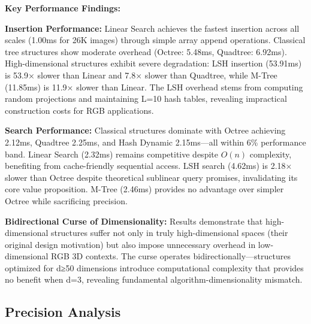 \documentclass{sbc2023}
\begin{document}
\textbf{Key Performance Findings:}

\textbf{Insertion Performance:} Linear Search achieves the fastest insertion across all scales (1.00ms for 26K images) through simple array append operations. Classical tree structures show moderate overhead (Octree: 5.48ms, Quadtree: 6.92ms). High-dimensional structures exhibit severe degradation: LSH insertion (53.91ms) is 53.9× slower than Linear and 7.8× slower than Quadtree, while M-Tree (11.85ms) is 11.9× slower than Linear. The LSH overhead stems from computing random projections and maintaining L=10 hash tables, revealing impractical construction costs for RGB applications.

\textbf{Search Performance:} Classical structures dominate with Octree achieving 2.12ms, Quadtree 2.25ms, and Hash Dynamic 2.15ms—all within 6\% performance band. Linear Search (2.32ms) remains competitive despite $O(n)$ complexity, benefiting from cache-friendly sequential access. LSH search (4.62ms) is 2.18× slower than Octree despite theoretical sublinear query promises, invalidating its core value proposition. M-Tree (2.46ms) provides no advantage over simpler Octree while sacrificing precision.

\textbf{Bidirectional Curse of Dimensionality:} Results demonstrate that high-dimensional structures suffer not only in truly high-dimensional spaces (their original design motivation) but also impose unnecessary overhead in low-dimensional RGB 3D contexts. The curse operates bidirectionally—structures optimized for d≥50 dimensions introduce computational complexity that provides no benefit when d=3, revealing fundamental algorithm-dimensionality mismatch.

\subsection{Precision Analysis}
\end{document}

